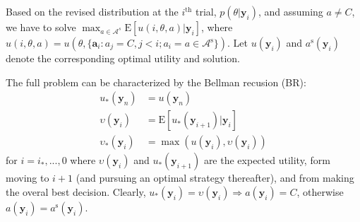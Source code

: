 \documentclass[11pt]{article}
\begin{document}
Based on the revised distribution at the $i^{\mathrm{th}}$ trial, $p(\theta|\mathbf{y}_i)$, and assuming $a \neq C$, we have to solve $\max_{a\in\mathcal{A}^s}\mathrm{E}[u(i,\theta,a)|\mathbf{y}_i]$, where 
$u(i,\theta,a)=u(\theta,\{\mathbf{a}_i:a_j=C,j<i;a_i=a\in \mathcal{A}^{\mathrm{s}}\})$. Let $u(\mathbf{y}_i)$ and $a^{\mathrm{s}}(\mathbf{y}_i)$ denote the corresponding optimal utility and solution.

The full problem can be characterized by the Bellman recusion (BR):
\begin{align}\label{br_term}
u_*(\mathbf{y}_n)&=u(\mathbf{y}_n)\\\label{br_cont}
\upsilon(\mathbf{y}_i)&=\mathrm{E}[u_*(\mathbf{y}_{i+1})|\mathbf{y}_i]\\\label{br_opt}
\upsilon_*(\mathbf{y}_i)&=\max(u(\mathbf{y}_i),\upsilon(\mathbf{y}_i))
\end{align}for $i=i_*,...,0$ where $\upsilon(\mathbf{y}_i)$ and $u_*(\mathbf{y}_{i+1})$ are the expected utility, form moving to $i+1$ (and pursuing an optimal strategy thereafter), and from making the overal best decision. Clearly, $u_*(\mathbf{y}_i)=\upsilon(\mathbf{y}_i)\Rightarrow a(\mathbf{y}_i)=C$, otherwise $a(\mathbf{y}_i)=a^{\mathrm{s}}(\mathbf{y}_i)$.
\end{document}
